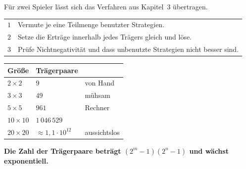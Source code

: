\begin{merksatz}
Für zwei Spieler lässt sich das Verfahren aus Kapitel~3 übertragen.

\begin{center}
{\small
\renewcommand{\arraystretch}{1.5}
\begin{tabular}{@{}P{1.0cm}P{7.4cm}@{}}
\toprule
$1$ & Vermute je eine Teilmenge benutzter Strategien.\\
$2$ & Setze die Erträge innerhalb jedes Trägers gleich und löse.\\
$3$ & Prüfe Nichtnegativität und dass unbenutzte Strategien nicht besser sind.\\
\bottomrule
\end{tabular}}
\end{center}

\begin{center}
{\small
\renewcommand{\arraystretch}{1.48}
\begin{tabular}{@{}P{2.2cm}P{3.0cm}P{2.6cm}@{}}
\toprule
\textbf{Größe} & \textbf{Trägerpaare} & \\
\midrule
$2\times2$ & $9$ & von Hand\\
$3\times3$ & $49$ & mühsam\\
$5\times5$ & $961$ & Rechner\\
$10\times10$ & $1\,046\,529$ & \\
$20\times20$ & $\approx1{,}1\cdot10^{12}$ & \textcolor{akzent}{aussichtslos}\\
\bottomrule
\end{tabular}}
\end{center}

\begin{center}
\begin{minipage}{0.9\textwidth}
\textbf{Die Zahl der Trägerpaare beträgt $(2^{m}-1)(2^{n}-1)$ und wächst exponentiell.}
\end{minipage}
\end{center}
\end{merksatz}

